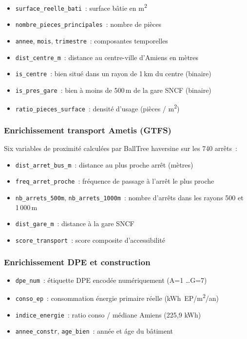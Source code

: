 \documentclass[12pt,a4paper]{article}
\begin{document}
\begin{itemize}
    \item \texttt{surface\_reelle\_bati}~: surface b\^atie en m\textsuperscript{2}
    \item \texttt{nombre\_pieces\_principales}~: nombre de pi\`eces
    \item \texttt{annee}, \texttt{mois}, \texttt{trimestre}~: composantes temporelles
    \item \texttt{dist\_centre\_m}~: distance au centre-ville d'Amiens en m\`etres
    \item \texttt{is\_centre}~: bien situ\'e dans un rayon de 1\,km du centre (binaire)
    \item \texttt{is\_pres\_gare}~: bien \`a moins de 500\,m de la gare SNCF (binaire)
    \item \texttt{ratio\_pieces\_surface}~: densit\'e d'usage (pi\`eces / m\textsuperscript{2})
\end{itemize}

\subsubsection{Enrichissement transport Ametis (GTFS)}

Six variables de proximit\'e calcul\'ees par BallTree haversine sur les 740 arr\^ets~:

\begin{itemize}
    \item \texttt{dist\_arret\_bus\_m}~: distance au plus proche arr\^et (m\`etres)
    \item \texttt{freq\_arret\_proche}~: fr\'equence de passage \`a l'arr\^et le plus proche
    \item \texttt{nb\_arrets\_500m}, \texttt{nb\_arrets\_1000m}~: nombre d'arr\^ets dans les rayons 500 et 1\,000\,m
    \item \texttt{dist\_gare\_m}~: distance \`a la gare SNCF
    \item \texttt{score\_transport}~: score composite d'accessibilit\'e
\end{itemize}

\subsubsection{Enrichissement DPE et construction}

\begin{itemize}
    \item \texttt{dpe\_num}~: \'etiquette DPE encod\'ee num\'eriquement (A=1 \ldots G=7)
    \item \texttt{conso\_ep}~: consommation \'energie primaire r\'eelle (kWh~EP/m\textsuperscript{2}/an)
    \item \texttt{indice\_energie}~: ratio conso / m\'ediane Amiens (225{,}9 kWh)
    \item \texttt{annee\_constr}, \texttt{age\_bien}~: ann\'ee et \'age du b\^atiment
\end{itemize}
\end{document}

